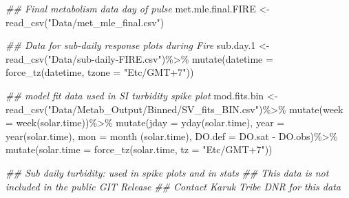 \documentclass[
  letterpaper,
  DIV=11,
  numbers=noendperiod]{scrartcl}
\newenvironment{Shaded}{\begin{snugshade}}{\end{snugshade}}
\newcommand{\AttributeTok}[1]{\textcolor[rgb]{0.40,0.45,0.13}{#1}}
\newcommand{\DocumentationTok}[1]{\textcolor[rgb]{0.37,0.37,0.37}{\textit{#1}}}
\newcommand{\FloatTok}[1]{\textcolor[rgb]{0.68,0.00,0.00}{#1}}
\newcommand{\FunctionTok}[1]{\textcolor[rgb]{0.28,0.35,0.67}{#1}}
\newcommand{\NormalTok}[1]{\textcolor[rgb]{0.00,0.23,0.31}{#1}}
\newcommand{\OtherTok}[1]{\textcolor[rgb]{0.00,0.23,0.31}{#1}}
\newcommand{\SpecialCharTok}[1]{\textcolor[rgb]{0.37,0.37,0.37}{#1}}
\newcommand{\StringTok}[1]{\textcolor[rgb]{0.13,0.47,0.30}{#1}}
\begin{document}
\begin{Shaded}
\begin{Highlighting}[]
\DocumentationTok{\#\# Final metabolism data day of pulse}
\NormalTok{met.mle.final.FIRE }\OtherTok{\textless{}{-}} \FunctionTok{read\_csv}\NormalTok{(}\StringTok{"Data/met\_mle\_final.csv"}\NormalTok{)}
  

\DocumentationTok{\#\# Data for sub{-}daily response plots during Fire}
\NormalTok{sub.day}\FloatTok{.1} \OtherTok{\textless{}{-}} \FunctionTok{read\_csv}\NormalTok{(}\StringTok{"Data/sub{-}daily{-}FIRE.csv"}\NormalTok{)}\SpecialCharTok{\%\textgreater{}\%}
  \FunctionTok{mutate}\NormalTok{(}\AttributeTok{datetime =} \FunctionTok{force\_tz}\NormalTok{(datetime, }\AttributeTok{tzone =} \StringTok{"Etc/GMT+7"}\NormalTok{))}


\DocumentationTok{\#\# model fit data used in SI turbidity spike plot}
\NormalTok{mod.fits.bin }\OtherTok{\textless{}{-}} \FunctionTok{read\_csv}\NormalTok{(}\StringTok{"Data/Metab\_Output/Binned/SV\_fits\_BIN.csv"}\NormalTok{)}\SpecialCharTok{\%\textgreater{}\%}
 \FunctionTok{mutate}\NormalTok{(}\AttributeTok{week =} \FunctionTok{week}\NormalTok{(solar.time))}\SpecialCharTok{\%\textgreater{}\%}
 \FunctionTok{mutate}\NormalTok{(}\AttributeTok{jday =} \FunctionTok{yday}\NormalTok{(solar.time),}
        \AttributeTok{year =} \FunctionTok{year}\NormalTok{(solar.time),}
        \AttributeTok{mon =} \FunctionTok{month}\NormalTok{ (solar.time),}
        \AttributeTok{DO.def =}\NormalTok{ DO.sat }\SpecialCharTok{{-}}\NormalTok{ DO.obs)}\SpecialCharTok{\%\textgreater{}\%}
   \FunctionTok{mutate}\NormalTok{(}\AttributeTok{solar.time =} \FunctionTok{force\_tz}\NormalTok{(solar.time, }\AttributeTok{tz =} \StringTok{"Etc/GMT+7"}\NormalTok{))}


\DocumentationTok{\#\# Sub daily turbidity: used in spike plots and in stats}
\DocumentationTok{\#\# This data is not included in the public GIT Release}
\DocumentationTok{\#\# Contact Karuk Tribe DNR for this data}


\end{Highlighting}
\end{Shaded}
\end{document}

